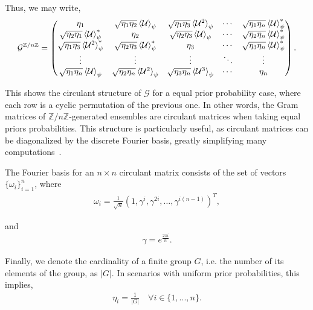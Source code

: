 \documentclass[12pt,letterpaper]{article}
\begin{document}
Thus, we may write,
\begin{align*}
	\mathcal{G}^{\mathbb{Z}/n\mathbb{Z}} = \begin{pmatrix}
 \eta_1 & \sqrt{\eta_1 \eta_2}\braket{\mathcal{U}}_{\psi} & \sqrt{\eta_1 \eta_3}\braket{\mathcal{U}^2}_{\psi} & \cdots & \sqrt{\eta_1 \eta_n}\braket{\mathcal{U}}^*_{\psi} \\
 \sqrt{\eta_2 \eta_1}\braket{\mathcal{U}}^*_{\psi} & \eta_2 & \sqrt{\eta_2 \eta_3}\braket{\mathcal{U}}_{\psi} & \cdots & \sqrt{\eta_2 \eta_n}\braket{\mathcal{U}}^*_{\psi} \\
 \sqrt{\eta_1 \eta_3}\braket{\mathcal{U}^2}^*_{\psi} & \sqrt{\eta_2 \eta_3}\braket{\mathcal{U}}^*_{\psi} & \eta_3 & \cdots & \sqrt{\eta_3 \eta_n}\braket{\mathcal{U}}^*_{\psi} \\
 \vdots & \vdots & \vdots & \ddots & \vdots \\
 \sqrt{\eta_1 \eta_n}\braket{\mathcal{U}}_{\psi} & \sqrt{\eta_2 \eta_n}\braket{\mathcal{U}^{2}}_{\psi} & \sqrt{\eta_3 \eta_n}\braket{\mathcal{U}^{3}}_{\psi} & \cdots & \eta_n
\end{pmatrix}.
\end{align*}

This shows the circulant structure of $\mathcal{G}$ for a equal prior probability case, where each row is a cyclic permutation of the previous one. In other words, the Gram matrices of $\mathbb{Z}/n\mathbb{Z}$-generated ensembles are circulant matrices when taking equal priors probabilities. This structure is particularly useful, as circulant matrices can be diagonalized by the discrete Fourier basis, greatly simplifying many computations~\cite{circulantMatrices}.

The Fourier basis for an $n \times n$ circulant matrix consists of the set of vectors $\{\omega_i\}_{i=1}^n$, where
\begin{align*}
	\omega_i = \frac{1}{\sqrt{n}} (1, \gamma^i, \gamma^{2i}, \ldots, \gamma^{i(n-1)})^T,
\end{align*}

and
\begin{align*}
	\gamma = e^{\frac{2\pi i}{n}}.
\end{align*}

Finally, we denote the cardinality of a finite group $G$, i.e. the number of its elements of the group, as $|G|$. In scenarios with uniform prior probabilities, this implies,
\begin{align*}
	\eta_i = \frac{1}{|G|}\quad \forall i\in\{1,...,n\}.
\end{align*}
\end{document}
